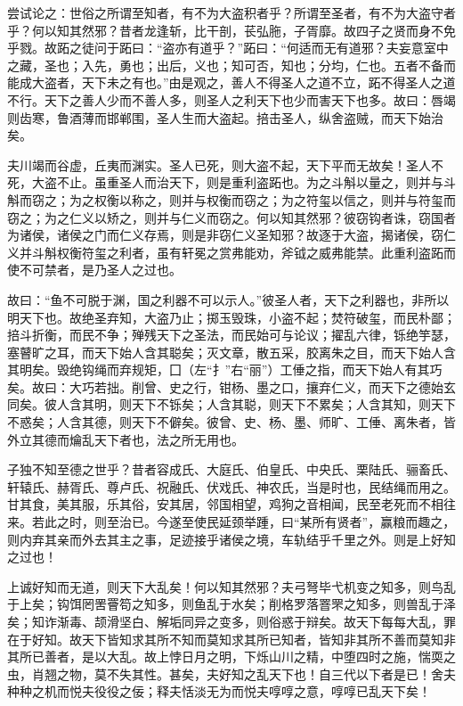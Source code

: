 \documentclass[]{article}
\begin{document}
尝试论之：世俗之所谓至知者，有不为大盗积者乎？所谓至圣者，有不为大盗守者乎？何以知其然邪？昔者龙逢斩，比干剖，苌弘胣，子胥靡。故四子之贤而身不免乎戮。故跖之徒问于跖曰：``盗亦有道乎？''跖曰：``何适而无有道邪？夫妄意室中之藏，圣也；入先，勇也；出后，义也；知可否，知也；分均，仁也。五者不备而能成大盗者，天下未之有也。''由是观之，善人不得圣人之道不立，跖不得圣人之道不行。天下之善人少而不善人多，则圣人之利天下也少而害天下也多。故曰：唇竭则齿寒，鲁酒薄而邯郸围，圣人生而大盗起。掊击圣人，纵舍盗贼，而天下始治矣。

夫川竭而谷虚，丘夷而渊实。圣人已死，则大盗不起，天下平而无故矣！圣人不死，大盗不止。虽重圣人而治天下，则是重利盗跖也。为之斗斛以量之，则并与斗斛而窃之；为之权衡以称之，则并与权衡而窃之；为之符玺以信之，则并与符玺而窃之；为之仁义以矫之，则并与仁义而窃之。何以知其然邪？彼窃钩者诛，窃国者为诸侯，诸侯之门而仁义存焉，则是非窃仁义圣知邪？故逐于大盗，揭诸侯，窃仁义并斗斛权衡符玺之利者，虽有轩冕之赏弗能劝，斧钺之威弗能禁。此重利盗跖而使不可禁者，是乃圣人之过也。

故曰：``鱼不可脱于渊，国之利器不可以示人。''彼圣人者，天下之利器也，非所以明天下也。故绝圣弃知，大盗乃止；掷玉毁珠，小盗不起；焚符破玺，而民朴鄙；掊斗折衡，而民不争；殚残天下之圣法，而民始可与论议；擢乱六律，铄绝竽瑟，塞瞽旷之耳，而天下始人含其聪矣；灭文章，散五采，胶离朱之目，而天下始人含其明矣。毁绝钩绳而弃规矩，囗（左``扌''右``丽''）工倕之指，而天下始人有其巧矣。故曰：大巧若拙。削曾、史之行，钳杨、墨之口，攘弃仁义，而天下之德始玄同矣。彼人含其明，则天下不铄矣；人含其聪，则天下不累矣；人含其知，则天下不惑矣；人含其德，则天下不僻矣。彼曾、史、杨、墨、师旷、工倕、离朱者，皆外立其德而爚乱天下者也，法之所无用也。

子独不知至德之世乎？昔者容成氏、大庭氏、伯皇氏、中央氏、栗陆氏、骊畜氏、轩辕氏、赫胥氏、尊卢氏、祝融氏、伏戏氏、神农氏，当是时也，民结绳而用之。甘其食，美其服，乐其俗，安其居，邻国相望，鸡狗之音相闻，民至老死而不相往来。若此之时，则至治已。今遂至使民延颈举踵，曰``某所有贤者''，赢粮而趣之，则内弃其亲而外去其主之事，足迹接乎诸侯之境，车轨结乎千里之外。则是上好知之过也！

上诚好知而无道，则天下大乱矣！何以知其然邪？夫弓弩毕弋机变之知多，则鸟乱于上矣；钩饵罔罟罾笱之知多，则鱼乱于水矣；削格罗落罯罘之知多，则兽乱于泽矣；知诈渐毒、颉滑坚白、解垢同异之变多，则俗惑于辩矣。故天下每每大乱，罪在于好知。故天下皆知求其所不知而莫知求其所已知者，皆知非其所不善而莫知非其所已善者，是以大乱。故上悖日月之明，下烁山川之精，中堕四时之施，惴耎之虫，肖翘之物，莫不失其性。甚矣，夫好知之乱天下也！自三代以下者是已！舍夫种种之机而悦夫役役之佞；释夫恬淡无为而悦夫啍啍之意，啍啍已乱天下矣！
\end{document}
